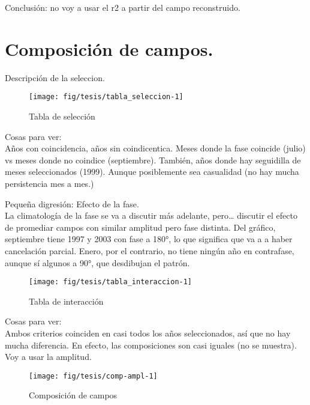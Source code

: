 \documentclass[spanish,a4paper]{book}
\begin{document}
Conclusión: no voy a usar el r2 a partir del campo reconstruido.

\section{Composición de campos.}\label{composicion-de-campos.}

Descripción de la seleccion.

\begin{figure}

{\centering \texttt{[image: fig/tesis/tabla\_seleccion-1]} 

}

\caption{Tabla de selección}\label{fig:tabla_seleccion}
\end{figure}

Cosas para ver:\\
Años con coincidencia, años sin coindicentica. Meses donde la fase
coincide (julio) vs meses donde no coindice (septiembre). También, años
donde hay seguidilla de meses seleccionados (1999). Aunque posiblemente
sea casualidad (no hay mucha persistencia mes a mes.)

Pequeña digresión: Efecto de la fase.\\
La climatología de la fase se va a discutir más adelante, pero\ldots{}
discutir el efecto de promediar campos con similar amplitud pero fase
distinta. Del gráfico, septiembre tiene 1997 y 2003 con fase a 180°, lo
que significa que va a a haber cancelación parcial. Enero, por el
contrario, no tiene ningún año en contrafase, aunque sí algunos a 90°,
que desdibujan el patrón.

\begin{figure}

{\centering \texttt{[image: fig/tesis/tabla\_interaccion-1]} 

}

\caption{Tabla de interacción}\label{fig:tabla_interaccion}
\end{figure}

Cosas para ver:\\
Ambos criterios coinciden en casi todos los años seleccionados, así que
no hay mucha diferencia. En efecto, las composiciones son casi iguales
(no se muestra). Voy a usar la amplitud.

\begin{figure}

{\centering \texttt{[image: fig/tesis/comp-ampl-1]} 

}

\caption{Composición de campos}\label{fig:comp-ampl}
\end{figure}
\end{document}
